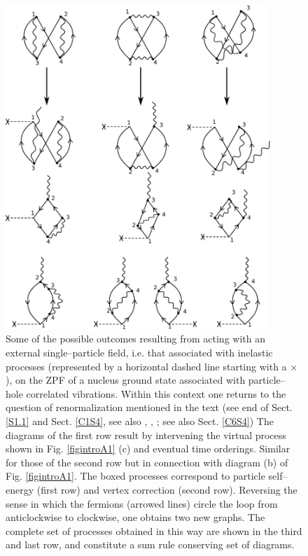 \begin{figure}
\centerline {
\includegraphics*[width=10cm]{introduccion/figs/figintroA2}
}
\caption{Some of the possible outcomes resulting from acting with an external single--particle field, i.e. that associated with inelastic processes (represented by a horizontal dashed line starting with a $\times$), on the ZPF of a nucleus ground state associated with particle--hole correlated vibrations. Within this context one returns to the question of  renormalization mentioned in the text (see end of Sect. \ref{S1.1} and Sect. \ref{C1S4}, see also \cite{Idini:15}, \cite{Broglia:16}, \cite{Barranco:17}; see also Sect. \ref{C6S4}) The diagrams of the first row result by intervening the virtual process shown in Fig. \ref{figintroA1} (c) and eventual time orderings. Similar for those of the second row but in connection with diagram (b) of Fig. \ref{figintroA1}. The boxed processes correspond to particle self--energy (first row) and vertex correction (second row). Reversing the sense in which the fermions (arrowed lines) circle the loop from anticlockwise to clockwise, one obtains two new graphs. The complete set of processes obtained in this way are shown in the third and last row, and constitute a sum rule conserving set of diagrams.}
\label{figintroA2}
\end{figure}
\clearpage
